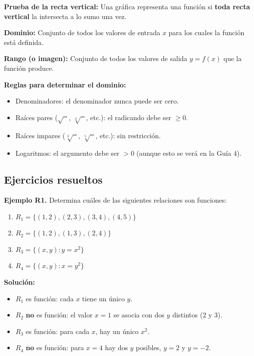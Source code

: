 \documentclass[12pt, letterpaper]{article}
\begin{document}
\begin{cuadrosolucion}
  \textbf{Prueba de la recta vertical:} Una gráfica representa una función si \textbf{toda recta vertical} la intersecta a lo sumo una vez.

  \textbf{Dominio:} Conjunto de todos los valores de entrada $x$ para los cuales la función está definida.

  \textbf{Rango (o imagen):} Conjunto de todos los valores de salida $y = f(x)$ que la función produce.
\end{cuadrosolucion}

\begin{cuadroadvertencia}
  \textbf{Reglas para determinar el dominio:}
  \begin{itemize}[leftmargin=*]
    \item Denominadores: el denominador nunca puede ser cero.
    \item Raíces pares ($\sqrt{\phantom{x}}$, $\sqrt[4]{\phantom{x}}$, etc.): el radicando debe ser $\geq 0$.
    \item Raíces impares ($\sqrt[3]{\phantom{x}}$, $\sqrt[5]{\phantom{x}}$, etc.): sin restricción.
    \item Logaritmos: el argumento debe ser $> 0$ (aunque esto se verá en la Guía 4).
  \end{itemize}
\end{cuadroadvertencia}

\subsection{Ejercicios resueltos}

\textbf{Ejemplo R1.} Determina cuáles de las siguientes relaciones son funciones:
\begin{enumerate}[label=\alph*)]
  \item $R_1 = \{(1, 2), (2, 3), (3, 4), (4, 5)\}$
  \item $R_2 = \{(1, 2), (1, 3), (2, 4)\}$
  \item $R_3 = \{(x, y) : y = x^2\}$
  \item $R_4 = \{(x, y) : x = y^2\}$
\end{enumerate}

\newpage %

\begin{cuadrosolucion}
  \textbf{Solución:}
  \begin{itemize}
    \item $R_1$ es función: cada $x$ tiene un único $y$.
    \item $R_2$ \textbf{no} es función: el valor $x = 1$ se asocia con dos $y$ distintos ($2$ y $3$).
    \item $R_3$ es función: para cada $x$, hay un único $x^2$.
    \item $R_4$ \textbf{no} es función: para $x = 4$ hay dos $y$ posibles, $y = 2$ y $y = -2$.
  \end{itemize}
\end{cuadrosolucion}
\end{document}
